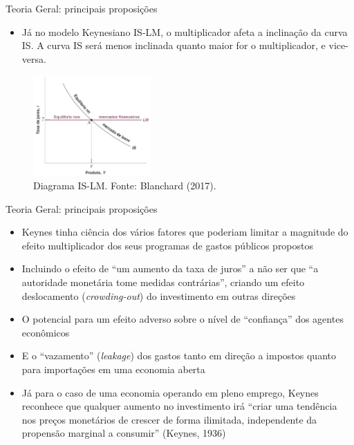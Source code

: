 \documentclass[10pt]{beamer}
\begin{document}
\begin{frame}{Teoria Geral: principais proposições}
    \begin{itemize}
        \item Já no modelo Keynesiano IS-LM, o multiplicador afeta a inclinação da curva IS. A curva IS será menos inclinada quanto maior for o multiplicador, e vice-versa.
    \end{itemize}
    \begin{figure}
        \centering
        \includegraphics[width=0.4\textwidth]{./figures/aula4_fig4}
        \caption{Diagrama IS-LM. Fonte: Blanchard (2017).}        
    \end{figure}
\end{frame}

\begin{frame}{Teoria Geral: principais proposições}
    \begin{itemize}
        \item Keynes tinha ciência dos vários fatores que poderiam limitar a magnitude do efeito multiplicador dos seus programas de gastos públicos propostos
        \bigskip
        \item Incluindo o efeito de ``um aumento da taxa de juros'' a não ser que ``a autoridade monetária tome medidas contrárias'', criando um efeito deslocamento (\emph{crowding-out}) do investimento em outras direções
        \bigskip
        \item O potencial para um efeito adverso sobre o nível de ``confiança'' dos agentes econômicos
        \bigskip
        \item E o ``vazamento'' (\emph{leakage}) dos gastos tanto em direção a impostos quanto para importações em uma economia aberta
        \bigskip
        \item Já para o caso de uma economia operando em pleno emprego, Keynes reconhece que qualquer aumento no investimento irá ``criar uma tendência nos preços monetários de crescer de forma ilimitada, independente da propensão marginal a consumir'' (Keynes, 1936)
    \end{itemize}
\end{frame}
\end{document}
